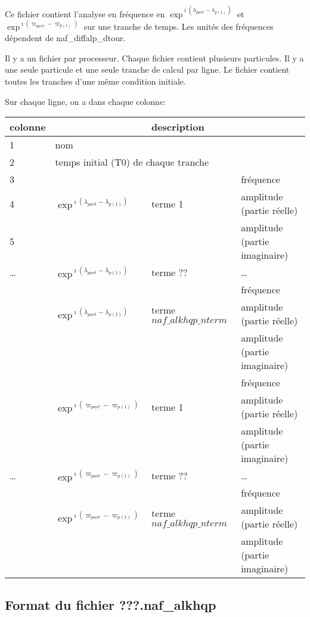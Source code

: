 \documentclass[11pt]{article}
\begin{document}
Ce fichier contient l'analyse en fr\'equence en  $\exp^{\imath(\lambda_{part}-\lambda_{p(1)})}$ et $\exp^{\imath(\varpi_{part}-\varpi_{p(1)})}$ sur une tranche de temps. Les unit\'es des fr\'equences d\'ependent de naf\_diffalp\_dtour.

 Il y a un fichier par processeur. Chaque fichier contient plusieurs particules.  Il y a une seule particule et une seule tranche de calcul  par ligne.  Le fichier contient toutes les tranches d'une m\^eme  condition initiale.


Sur chaque ligne, on a dans chaque colonne: 

\begin{tabularx}{\textwidth}{|l|l|l|X|}
 \hline
 colonne &      \multicolumn{3}{c|}{description} \\ \hline
1  &    \multicolumn{3}{l|}{nom} \\ \hline
2  &    \multicolumn{3}{l|}{temps initial (T0) de chaque tranche} \\ \hline
3 & &    & fr\'equence\\
4 &$\exp^{\imath(\lambda_{part}-\lambda_{p(1)})}$& terme 1 & amplitude (partie r\'eelle)\\
5 &   & &amplitude (partie imaginaire)\\ \hline
\dots &  $\exp^{\imath(\lambda_{part}-\lambda_{p(1)})}$& terme ?? &\dots \\ \hline
 & &    &fr\'equence\\
 &  $\exp^{\imath(\lambda_{part}-\lambda_{p(1)})}$ & terme $naf\_alkhqp\_nterm$ & amplitude (partie r\'eelle)\\
 & &    &amplitude (partie imaginaire)\\ \hline
 & &   & fr\'equence\\
 &$\exp^{\imath(\varpi_{part}-\varpi_{p(1)})}$& terme 1 & amplitude (partie r\'eelle)\\
 &    & &amplitude (partie imaginaire)\\ \hline
\dots & $\exp^{\imath(\varpi_{part}-\varpi_{p(1)})}$& terme ?? &\dots \\ \hline
 & &    &fr\'equence\\
 & $\exp^{\imath(\varpi_{part}-\varpi_{p(1)})}$ & terme $naf\_alkhqp\_nterm$ & amplitude (partie r\'eelle)\\
 &   & &amplitude (partie imaginaire)\\ \hline
\end{tabularx}

\subsection{Format du fichier {\bf ???.naf\_alkhqp} }
\end{document}
